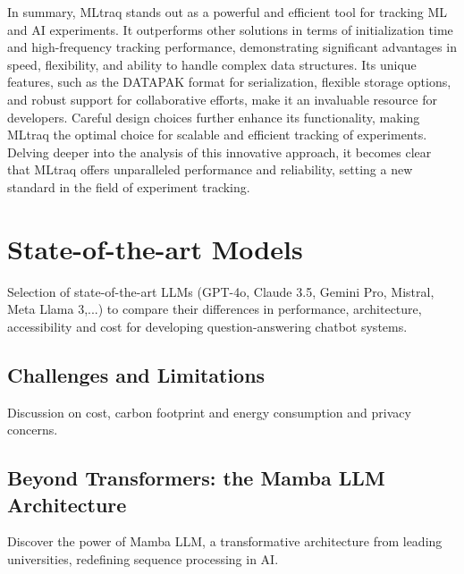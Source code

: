 In summary, MLtraq stands out as a powerful and efficient tool for tracking ML and AI experiments. It outperforms other solutions in terms of initialization time and high-frequency tracking performance, demonstrating significant advantages in speed, flexibility, and ability to handle complex data structures. Its unique features, such as the DATAPAK format for serialization, flexible storage options, and robust support for collaborative efforts, make it an invaluable resource for developers. Careful design choices further enhance its functionality, making MLtraq the optimal choice for scalable and efficient tracking of experiments. Delving deeper into the analysis of this innovative approach, it becomes clear that MLtraq offers unparalleled performance and reliability, setting a new standard in the field of experiment tracking.

\newpage

\section{State-of-the-art Models}
Selection of state-of-the-art LLMs (GPT-4o, Claude 3.5, Gemini Pro, Mistral, Meta Llama 3,...) to compare their differences in performance, architecture, accessibility and cost for developing question-answering chatbot systems.

\subsection{Challenges and Limitations}
Discussion on cost, carbon footprint and energy consumption and privacy concerns.

\subsection{Beyond Transformers: the Mamba LLM Architecture}
Discover the power of Mamba LLM, a transformative architecture from leading universities, redefining sequence processing in AI.

